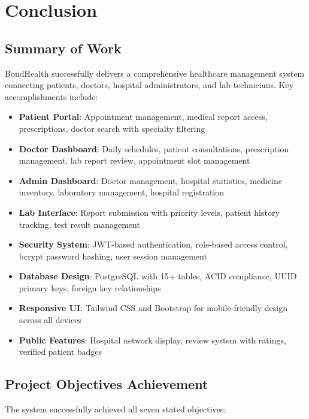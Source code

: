 \chapter{Conclusion}

\section{Summary of Work}
BondHealth successfully delivers a comprehensive healthcare management system connecting patients, doctors, hospital administrators, and lab technicians. Key accomplishments include:

\begin{itemize}
    \item \textbf{Patient Portal}: Appointment management, medical report access, prescriptions, doctor search with specialty filtering
    \item \textbf{Doctor Dashboard}: Daily schedules, patient consultations, prescription management, lab report review, appointment slot management
    \item \textbf{Admin Dashboard}: Doctor management, hospital statistics, medicine inventory, laboratory management, hospital registration
    \item \textbf{Lab Interface}: Report submission with priority levels, patient history tracking, test result management
    \item \textbf{Security System}: JWT-based authentication, role-based access control, bcrypt password hashing, user session management
    \item \textbf{Database Design}: PostgreSQL with 15+ tables, ACID compliance, UUID primary keys, foreign key relationships
    \item \textbf{Responsive UI}: Tailwind CSS and Bootstrap for mobile-friendly design across all devices
    \item \textbf{Public Features}: Hospital network display, review system with ratings, verified patient badges
\end{itemize}

\section{Project Objectives Achievement}

The system successfully achieved all seven stated objectives:

